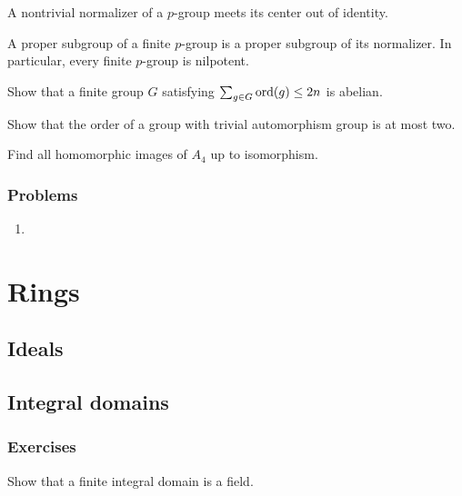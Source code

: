 \documentclass{../note}
\begin{document}
\begin{prb}[$p$-groups]
\begin{parts}
\item A nontrivial normalizer of a $p$-group meets its center out of identity.
\item A proper subgroup of a finite $p$-group is a proper subgroup of its normalizer. In particular, every finite $p$-group is nilpotent.
\end{parts}
\end{prb}

\begin{prb}
Show that a finite group $G$ satisfying $\sum_{g\in G}\operatorname{ord}(g)\le2n$ is abelian.
\end{prb}

\begin{prb}
Show that the order of a group with trivial automorphism group is at most two.
\end{prb}

\begin{prb}
Find all homomorphic images of $A_4$ up to isomorphism.
\end{prb}

\section*{Problems}
\begin{enumerate}
\item 
\end{enumerate}







\part{Rings}
\chapter{Ideals}


\chapter{Integral domains}

\section*{Exercises}
\begin{prb}
Show that a finite integral domain is a field.
\end{prb}
\end{document}

